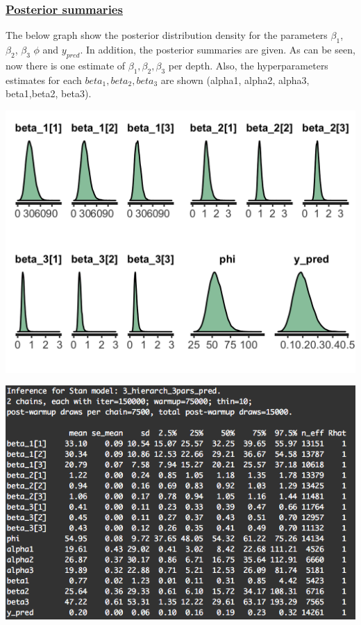 \documentclass{article}
\begin{document}
\subsubsection*{\underline{Posterior summaries}}
The below graph show the posterior distribution density for the parameters $\beta_1$, $\beta_2$, $\beta_3$ $\phi$ and $y_{pred}$. In addition, the posterior summaries are given. As can be seen, now there is one estimate of $\beta_1,\beta_2,\beta_3$ per depth. Also, the hyperparameters estimates for each $beta_1, beta_2, beta_3$ are shown (alpha1, alpha2, alpha3, beta1,beta2, beta3).
\begin{minipage}{0.50\textwidth}
\includegraphics[width=\linewidth]{hier_3pars_dens.png}
\end{minipage}
\begin{minipage}{0.50\textwidth}
\includegraphics[width=\linewidth]{p06.png}
\end{minipage}
\end{document}
